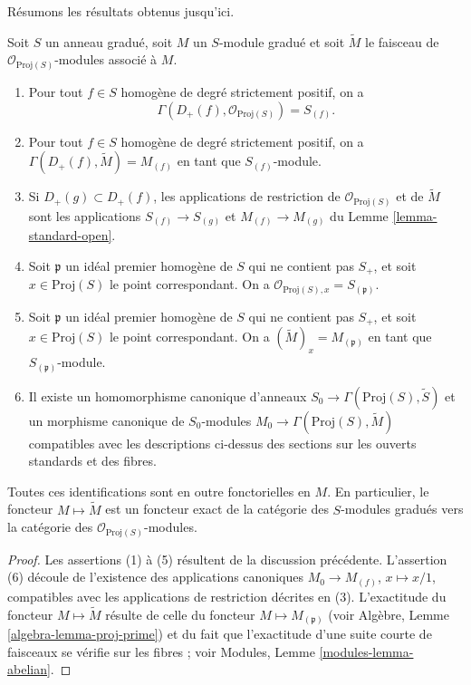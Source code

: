 \noindent
Résumons les résultats obtenus jusqu'ici.

\begin{lemma}
\label{lemma-proj-sheaves}
Soit $S$ un anneau gradué, soit $M$ un $S$-module gradué et soit
$\widetilde M$ le faisceau de $\mathcal{O}_{\text{Proj}(S)}$-modules associé
à $M$.
\begin{enumerate}
\item Pour tout $f \in S$ homogène de degré strictement positif, on a
$$
\Gamma(D_{+}(f), \mathcal{O}_{\text{Proj}(S)}) = S_{(f)}.
$$
\item Pour tout $f\in S$ homogène de degré strictement positif, on a
$\Gamma(D_{+}(f), \widetilde M) = M_{(f)}$ en tant que $S_{(f)}$-module.
\item Si $D_{+}(g) \subset D_{+}(f)$, les applications de restriction de
$\mathcal{O}_{\text{Proj}(S)}$ et de $\widetilde M$ sont les applications
$S_{(f)} \to S_{(g)}$ et $M_{(f)} \to M_{(g)}$ du
Lemme \ref{lemma-standard-open}.
\item Soit $\mathfrak p$ un idéal premier homogène de $S$ qui ne contient pas
$S_{+}$, et soit $x \in \text{Proj}(S)$ le point correspondant. On a
$\mathcal{O}_{\text{Proj}(S), x} = S_{(\mathfrak p)}$.
\item Soit $\mathfrak p$ un idéal premier homogène de $S$ qui ne contient pas
$S_{+}$, et soit $x \in \text{Proj}(S)$ le point correspondant. On a
$(\widetilde M)_x = M_{(\mathfrak p)}$ en tant que
$S_{(\mathfrak p)}$-module.
\item
\label{item-map}
Il existe un homomorphisme canonique d'anneaux
$
S_0 \longrightarrow \Gamma(\text{Proj}(S), \widetilde S)
$
et un morphisme canonique de $S_0$-modules
$
M_0 \longrightarrow \Gamma(\text{Proj}(S), \widetilde M)
$
compatibles avec les descriptions ci-dessus des sections sur les ouverts
standards et des fibres.
\end{enumerate}
Toutes ces identifications sont en outre fonctorielles en $M$. En particulier,
le foncteur $M \mapsto \widetilde M$ est un
foncteur exact de la catégorie des $S$-modules gradués vers la catégorie des
$\mathcal{O}_{\text{Proj}(S)}$-modules.
\end{lemma}

\begin{proof}
Les assertions (1) à (5) résultent de la discussion précédente.
L'assertion (6) découle de l'existence des applications canoniques
$M_0 \to M_{(f)}$, $x \mapsto x/1$, compatibles avec les applications de
restriction décrites en (3). L'exactitude du foncteur
$M \mapsto \widetilde M$ résulte de celle du foncteur
$M \mapsto M_{(\mathfrak p)}$ (voir Algèbre,
Lemme \ref{algebra-lemma-proj-prime}) et du fait que l'exactitude d'une suite
courte de faisceaux se vérifie sur les fibres ; voir Modules,
Lemme \ref{modules-lemma-abelian}.
\end{proof}


